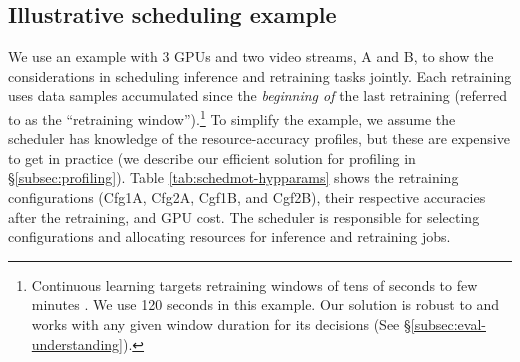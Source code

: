 

\subsection{Illustrative scheduling example}
\label{subsec:motivation-sched-example}


We use an example with $3$ GPUs and two video streams, A and B, to show the considerations in scheduling inference and retraining tasks jointly.
Each retraining uses data samples accumulated since the {\em beginning of} the last retraining (referred to as the ``retraining window'').\footnote{Continuous learning targets retraining windows of tens of seconds to few minutes \cite{distribution-20, mullapudi2019}. We use 120 seconds in this example. Our solution is robust to and works with any given window duration for its decisions (See \S{\ref{subsec:eval-understanding}}).} %
To simplify the example, we assume the scheduler has knowledge of the resource-accuracy profiles, but these are expensive to get in practice (we describe our efficient solution for profiling in \S\ref{subsec:profiling}).
Table \ref{tab:schedmot-hypparams} shows the retraining configurations ({Cfg1A, Cfg2A, Cgf1B, and Cgf2B}), their respective accuracies after the retraining, and GPU cost.
The scheduler is responsible for selecting configurations and allocating resources for inference and retraining jobs.





